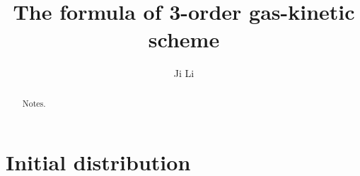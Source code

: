 \documentclass[review]{elsarticle}
\begin{document}
\begin{frontmatter}
	
\title{The formula of 3-order gas-kinetic scheme}
\author{Ji Li}


\address{National Key Laboratory of Science and Technology on Aerodynamic Design and Research, Northwestern Polytechnical 
University, Xi'an, Shaanxi 710072, China}

\begin{abstract}
	Notes.
\end{abstract}
\end{frontmatter}

\section{Initial distribution}
\end{document}
